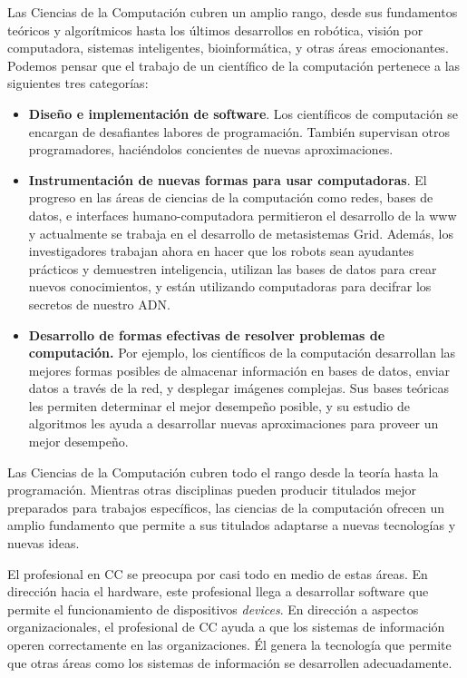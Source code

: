 Las Ciencias de la Computación cubren un amplio rango, desde sus fundamentos teóricos y algorítmicos hasta 
los \'ultimos desarrollos en robótica, visión por computadora, sistemas inteligentes, bioinformática, y 
otras áreas emocionantes. Podemos pensar que el trabajo de un científico de la computación pertenece 
a las siguientes tres categorías:

\begin{itemize}
\item \textbf{Diseño e implementación de software}. Los científicos de computación se encargan de 
desafiantes labores de programación. También supervisan otros programadores, haciéndolos concientes 
de nuevas aproximaciones.

\item \textbf{Instrumentación de nuevas formas para usar computadoras}. El progreso en las áreas 
de ciencias de la computación como redes, bases de datos, e interfaces humano-computadora permitieron 
el desarrollo de la www y actualmente se trabaja en el desarrollo de metasistemas Grid. Además, 
los investigadores trabajan ahora en hacer que los robots sean ayudantes prácticos y demuestren 
inteligencia, utilizan las bases de datos para crear nuevos conocimientos, y están utilizando 
computadoras para decifrar los secretos de nuestro ADN.

\item \textbf{Desarrollo de formas efectivas de resolver problemas de computación.} 
Por ejemplo, los científicos de la computación desarrollan las mejores formas posibles 
de almacenar información en bases de datos, enviar datos a través de la red, y 
desplegar imágenes complejas. Sus bases teóricas les permiten determinar el 
mejor desempeño posible, y su estudio de algoritmos les ayuda a desarrollar 
nuevas aproximaciones para proveer un mejor desempeño.
\end{itemize}

Las Ciencias de la Computación cubren todo el rango desde la teoría hasta la programación. Mientras otras disciplinas pueden producir titulados mejor preparados para trabajos específicos, las ciencias de la computación ofrecen un amplio fundamento que permite a sus titulados adaptarse a nuevas tecnologías y nuevas ideas.

El profesional en \ac{CC} se preocupa por casi todo en medio de estas áreas. En dirección hacia el hardware, este profesional llega a desarrollar software que permite el funcionamiento de dispositivos {\it devices}. En dirección a aspectos organizacionales, el profesional de \ac{CC} ayuda a que los sistemas de información operen correctamente en las organizaciones. Él genera la tecnología que permite que otras áreas como los sistemas de información se desarrollen adecuadamente.

